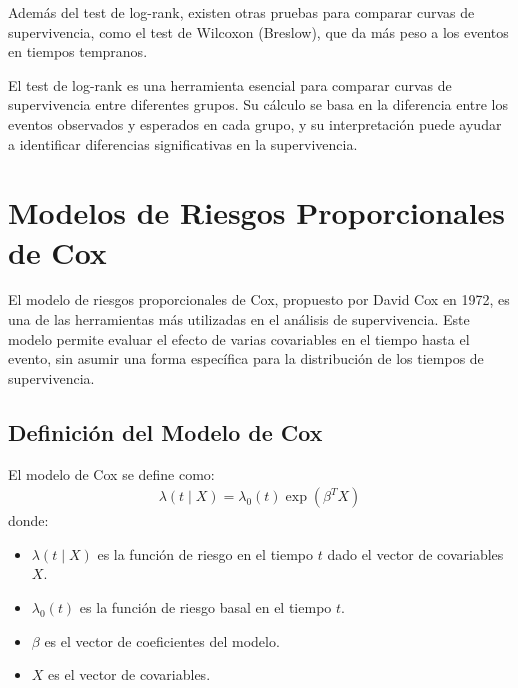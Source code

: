 \documentclass[a4paper]{report} %
\begin{document}
Adem\'as del test de log-rank, existen otras pruebas para comparar curvas de supervivencia, como el test de Wilcoxon (Breslow), que da m\'as peso a los eventos en tiempos tempranos.

El test de log-rank es una herramienta esencial para comparar curvas de supervivencia entre diferentes grupos. Su c\'alculo se basa en la diferencia entre los eventos observados y esperados en cada grupo, y su interpretaci\'on puede ayudar a identificar diferencias significativas en la supervivencia.


\chapter{Modelos de Riesgos Proporcionales de Cox}

El modelo de riesgos proporcionales de Cox, propuesto por David Cox en 1972, es una de las herramientas m\'as utilizadas en el an\'alisis de supervivencia. Este modelo permite evaluar el efecto de varias covariables en el tiempo hasta el evento, sin asumir una forma espec\'ifica para la distribuci\'on de los tiempos de supervivencia.

\section*{Definici\'on del Modelo de Cox}
El modelo de Cox se define como:
\begin{eqnarray*}
\lambda(t \mid X) = \lambda_0(t) \exp(\beta^T X)
\end{eqnarray*}
donde:
\begin{itemize}
    \item $\lambda(t \mid X)$ es la funci\'on de riesgo en el tiempo $t$ dado el vector de covariables $X$.
    \item $\lambda_0(t)$ es la funci\'on de riesgo basal en el tiempo $t$.
    \item $\beta$ es el vector de coeficientes del modelo.
    \item $X$ es el vector de covariables.
\end{itemize}
\end{document}
